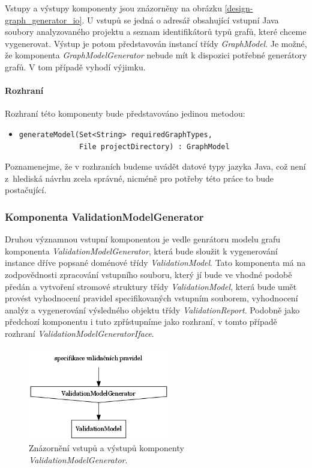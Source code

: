 Vstupy a výstupy komponenty jsou znázorněny na obrázku \ref{design-graph_generator_io}. U vstupů se jedná o adresář obsahující vstupní Java soubory analyzovaného projektu a seznam identifikátorů typů grafů, které chceme vygenerovat. Výstup je potom představován instancí třídy \emph{GraphModel}. Je možné, že komponenta  \emph{GraphModelGenerator} nebude mít k dispozici potřebné generátory grafů. V tom případě vyhodí výjimku.

\paragraph{Rozhraní}
Rozhraní této komponenty bude představováno jedinou metodou:
\begin{itemize}
\item \begin{verbatim}generateModel(Set<String> requiredGraphTypes,
              File projectDirectory) : GraphModel\end{verbatim}
\end{itemize}

Poznamenejme, že v rozhraních budeme uvádět datové typy jazyka Java, což není z~hlediská návrhu zcela správné, nicméně pro potřeby této práce to bude postačující.

\subsubsection{Komponenta ValidationModelGenerator}
Druhou významnou vstupní komponentou je vedle genrátoru modelu grafu komponenta \emph{ValidationModelGenerator}, která bude sloužit k vygenerování instance dříve popsané doménové třídy \emph{ValidationModel}. Tato komponenta má na zodpovědnosti zpracování vstupního souboru, který jí bude ve vhodné podobě předán a vytvoření stromové struktury třídy \emph{ValidationModel}, která bude umět provést vyhodnocení pravidel specifikovaných vstupním souborem, vyhodnocení analýz a vygenerování výsledného objektu třídy \emph{ValidationReport}. Podobně jako předchozí komponentu i tuto zpřístupníme jako rozhraní, v tomto případě rozhraní \emph{ValidationModelGeneratorIface}.

\begin{figure}[h!]
  \centering
  \includegraphics[width=0.55\textwidth]{./graphs/validation_model_generator_io_graph.png}
  \caption{Znázornění vstupů a výstupů komponenty \emph{ValidationModelGenerator}.\label{design-validation_model_generator_io}}
\end{figure}

